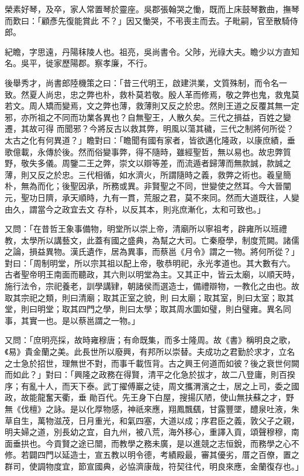 \begin{pinyinscope}
 榮素好琴，及卒，家人常置琴於靈座。吳郡張翰哭之慟，既而上床鼓琴數曲，撫琴而歎曰：「顧彥先復能賞此
 不？」因又慟哭，不弔喪主而去。子毗嗣，官至散騎侍郎。



 紀瞻，字思遠，丹陽秣陵人也。祖亮，吳尚書令。父陟，光祿大夫。瞻少以方直知名。吳平，徙家歷陽郡。察孝廉，不行。



 後舉秀才，尚書郎陸機策之曰：「昔三代明王，啟建洪業，文質殊制，而令名一致。然夏人尚忠，忠之弊也朴，救朴莫若敬。殷人革而修焉，敬之弊也鬼，救鬼莫若文。周人矯而變焉，文之弊也薄，救薄則又反之於忠。然則王道之反覆其無一定邪，亦所祖之不同而功業各異也？自無聖王，人散久矣。三代之損益，百姓之變遷，其故可得
 而聞邪？今將反古以救其弊，明風以蕩其穢，三代之制將何所從？太古之化有何異道？」瞻對曰：「瞻聞有國有家者，皆欲邁化隆政，以康庶績，垂歌億載，永傳於後。然而俗變事弊，得不隨時，雖經聖哲，無以易也。故忠弊質野，敬失多儀。周鑒二王之弊，崇文以辯等差，而流遁者歸薄而無款誠，款誠之薄，則又反之於忠。三代相循，如水濟火，所謂隨時之義，救弊之術也。羲皇簡朴，無為而化；後聖因承，所務或異。非賢聖之不同，世變使之然耳。今大晉闡元，聖功日隮，承天順時，九有一貫，荒服之君，莫不來同。然而大道既往，人變由久，謂當今之政宜去文
 存朴，以反其本，則兆庶漸化，太和可致也。」



 又問：「在昔哲王象事備物，明堂所以崇上帝，清廟所以寧祖考，辟雍所以班禮教，太學所以講藝文，此蓋有國之盛典，為幫之大司。亡秦廢學，制度荒闕。諸儒之論，損益異物。漢氏遺作，居為異事，而蔡邕《月令》謂之一物。將何所從？」對曰：「周制明堂，所以宗其祖以配上帝，敬恭明祀，永光孝道也。其大數有六。古者聖帝明王南面而聽政，其六則以明堂為主。又其正中，皆云太廟，以順天時，施行法令，宗祀養老，訓學講肄，朝諸侯而選造士，備禮辯物，一教化之由也。故取其宗祀之類，則曰清廟；取其正室之貌，則
 曰太廟；取其室，則曰太室；取其堂，則曰明堂；取其四門之學，則曰太學；取其周水圜如璧，則白璧雍。異名同事，其實一也。是以蔡邕謂之一物。」



 又問：「庶明亮採，故時雍穆唐；有命既集，而多士隆周。故《書》稱明良之歌，《易》貴金蘭之美。此長世所以廢興，有邦所以崇替。夫成功之君勤於求才，立名之士急於招世，理無世不對，而事千載恆背。古之興王何道而如彼？後之衰世何闕而如此？」對曰：「興隆之政務在得賢，清平之化急於拔才，故二八登庸，則百揆序；有亂十人，而天下泰。武丁擢傅巖之徒，周文攜渭濱之士，居之上司，委之國政，故能龍奮天衢，垂
 勛百代。先王身下白屋，搜揚仄陋，使山無扶蘇之才，野無《伐檀》之詠。是以化厚物感，神祇來應，翔鳳飄颻，甘露豐墜，醴泉吐液，朱草自生，萬物滋茂，日月重光，和氣四塞，大道以成；序君臣之義，敦父子之親，明夫婦之道，別長幼之宜，自九州，被八荒，海外移心，重譯入貢，頌聲穆穆，南面垂拱也。今貢賢之途已闓，而教學之務未廣，是以進競之志恒銳，而務學之心不修。若闢四門以延造士，宣五教以明令德，考績殿最，審其優劣，厝之百僚，置之群司，使調物度宜，節宣國典，必協濟康哉，符契往代，明良來應，金蘭復存也。」




\end{pinyinscope}
